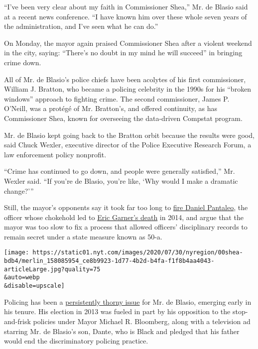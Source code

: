 ``I've been very clear about my faith in Commissioner Shea,'' Mr. de
Blasio said at a recent news conference. ``I have known him over these
whole seven years of the administration, and I've seen what he can do.''

On Monday, the mayor again praised Commissioner Shea after a violent
weekend in the city, saying: ``There's no doubt in my mind he will
succeed'' in bringing crime down.

All of Mr. de Blasio's police chiefs have been acolytes of his first
commissioner, William J. Bratton, who became a policing celebrity in the
1990s for his ``broken windows'' approach to fighting crime. The second
commissioner, James P. O'Neill, was a protégé of Mr. Bratton's, and
offered continuity, as has Commissioner Shea, known for overseeing the
data-driven Compstat program.

Mr. de Blasio kept going back to the Bratton orbit because the results
were good, said Chuck Wexler, executive director of the Police Executive
Research Forum, a law enforcement policy nonprofit.

``Crime has continued to go down, and people were generally satisfied,''
Mr. Wexler said. ``If you're de Blasio, you're like, `Why would I make a
dramatic change?'''

Still, the mayor's opponents say it took far too long to
\href{https://www.nytimes.com/2019/08/19/nyregion/daniel-pantaleo-fired.html}{fire
Daniel Pantaleo}, the officer whose chokehold led to
\href{https://www.nytimes.com/2015/06/14/nyregion/eric-garner-police-chokehold-staten-island.html}{Eric
Garner's death} in 2014, and argue that the mayor was too slow to fix a
process that allowed officers' disciplinary records to remain secret
under a state measure known as 50-a.

\texttt{[image: https://static01.nyt.com/images/2020/07/30/nyregion/00shea-bdb4/merlin\_158085954\_ce8b9923-1d77-4b2d-b4fa-f1f8b4aa4043-articleLarge.jpg?quality=75\\\&auto=webp\\\&disable=upscale]}

Policing has been a
\href{https://www.nytimes.com/2015/01/12/nyregion/in-police-rift-mayor-de-blasios-missteps-included-thinking-it-would-pass.html}{persistently
thorny issue} for Mr. de Blasio, emerging early in his tenure. His
election in 2013 was fueled in part by his opposition to the
stop-and-frisk policies under Mayor Michael R. Bloomberg, along with a
television ad starring Mr. de Blasio's son, Dante, who is Black and
pledged that his father would end the discriminatory policing practice.

